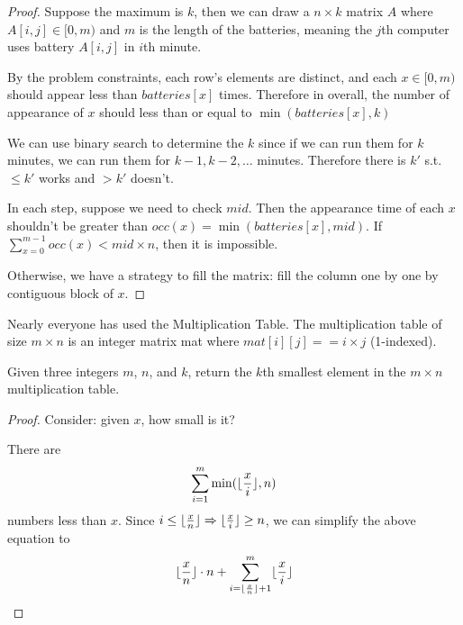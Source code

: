 \documentclass[11pt]{article}
\begin{document}
\begin{proof}
Suppose the maximum is \(k\), then we can draw a \(n\times k\) matrix \(A\) where \(A[i,j]\in[0,m)\)
and \(m\) is the length of the batteries, meaning the \(j\)th computer uses battery \(A[i,j]\)
in \(i\)th minute.

By the problem constraints, each row's elements are distinct, and each \(x\in[0,m)\) should
appear less than \(batteries[x]\) times. Therefore in overall, the number of appearance of \(x\)
should less than or equal to \(\min(batteries[x],k)\)

We can use binary search to determine the \(k\) since if we can run them for \(k\) minutes, we can
run them for \(k-1,k-2,\dots\) minutes. Therefore there is \(k'\) s.t. \(\le k'\) works and \(>k'\)
doesn't.

In each step, suppose we need to check \(mid\). Then the appearance time of each \(x\) shouldn't
be greater than \(occ(x)=\min(batteries[x],mid)\). If \(\sum_{x=0}^{m-1} occ(x)<mid\times n\), then it
is impossible.

Otherwise, we have a strategy to fill the matrix: fill the column one by one by contiguous block
of \(x\).
\end{proof}

\begin{problem}
Nearly everyone has used the Multiplication Table. The multiplication table of size \(m\times n\) is an
integer matrix mat where \(mat[i][j] == i\times j\) (1-indexed).

Given three integers \(m\), \(n\), and \(k\), return the \(k\)th smallest element in the \(m\times n\) multiplication table.
\end{problem}

\begin{proof}
Consider: given \(x\), how small is it?

There are
\begin{equation*}
\sum_{i=1}^m\min(\lfloor \frac{x}{i} \rfloor,n)
\end{equation*}
numbers less than \(x\). Since \(i\le\lfloor \frac{x}{n} \rfloor\Rightarrow\lfloor \frac{x}{i} \rfloor\ge n\), we can simplify
the above equation to
\begin{equation*}
\lfloor \frac{x}{n} \rfloor\cdot n+\sum_{i=\lfloor \frac{x}{n} \rfloor+1}^m\lfloor \frac{x}{i} \rfloor
\end{equation*}
\end{proof}
\end{document}
